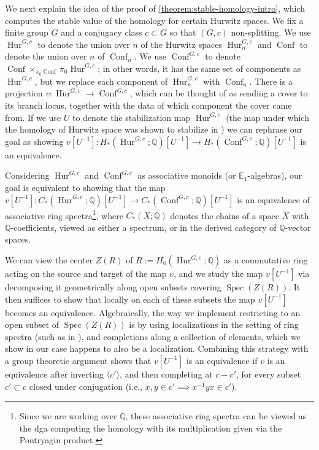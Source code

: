 \documentclass[12 pt]{amsart}
\theoremstyle{plain}
\theoremstyle{definition}
\theoremstyle{remark}
\numberwithin{equation}{section}
\DeclareMathOperator\Spec{Spec}
\DeclareMathOperator\Hur{Hur}
\DeclareMathOperator\Conf{Conf}
\newcommand\QQ{\mathbb{Q}}
\newcommand\EE{\mathbb{E}}
\begin{document}
We next explain the idea of the proof of \autoref{theorem:stable-homology-intro},
which
computes the stable value of the homology for certain Hurwitz spaces.
We fix a finite group $G$ and a conjugacy class $c \subset G$ so that $(G,c)$ non-splitting.
We use $\Hur^{G,c}$ to denote the union over $n$ of the Hurwitz spaces
$\Hur^{G,c}_{n}$ and $\Conf$ to denote the union over $n$ of $\Conf_n$. We use $\Conf^{G,c}$ to denote $\Conf\times_{\pi_0\Conf}\pi_0\Hur^{G,c}$; 
in other words, it has the same
set of components as $\Hur^{G,c}$, but we replace each component of
$\Hur^{G,c}_{n}$ with $\Conf_n$.
There is a projection $v: \Hur^{G,c} \to \Conf^{G,c}$, which can be thought of
as sending a cover to
its branch locus, together with the data of which component the cover came from.
If we use $U$ to denote the stabilization map $\Hur^{G,c}$ (the map under which
	the homology of Hurwitz space was shown to stabilize in \cite[Theorem 6.1]{EllenbergVW:cohenLenstra})
we can rephrase our goal as showing $v[U^{-1}] : H_*(\Hur^{G,c};\QQ)[U^{-1}] \to
H_*(\Conf^{G,c};\QQ)[U^{-1}]$
is an equivalence. 

Considering $\Hur^{G,c}$ and $\Conf^{G,c}$ as associative monoids (or
$\EE_1$-algebras), our goal is equivalent to showing that the map $v[U^{-1}]:C_*(\Hur^{G,c};\QQ)[U^{-1}] \to
C_*(\Conf^{G,c};\QQ)[U^{-1}]$ is an equivalence of associative ring spectra\footnote{Since we are working over $\QQ$, these associative ring spectra can be viewed as the dga computing the homology with its multiplication given via the Pontryagin product.}, where $C_*(X;\QQ)$ denotes the chains of a space $X$ with $\QQ$-coefficients, viewed as either a spectrum, or in the derived category of $\QQ$-vector spaces.

We can view the center $Z(R)$ of $R:=H_0(\Hur^{G,c};\QQ)$ as a commutative ring
acting on the source and target of the map $v$, and we study the map $v[U^{-1}]$
via decomposing it geometrically along open subsets covering $\Spec(Z(R))$. It
then suffices to show that locally on each of these subsets the map $v[U^{-1}]$
becomes an equivalence. Algebraically, the way we implement restricting to an
open subset of $\Spec(Z(R))$ is by using localizations in the setting of ring
spectra (such as in \cite[Section 7.2.3]{HA}), and completions along a collection of elements,
which we show in our case happens to also be a localization. Combining this
strategy with a group theoretic argument shows that $v[U^{-1}]$ is an
equivalence if $v$ is an equivalence after inverting 
$\langle c' \rangle$, and then completing at $c - c'$,
for every subset $c' \subset c$ closed under conjugation
(i.e., $x, y \in c' \implies x^{-1}yx \in c'$).
\end{document}
